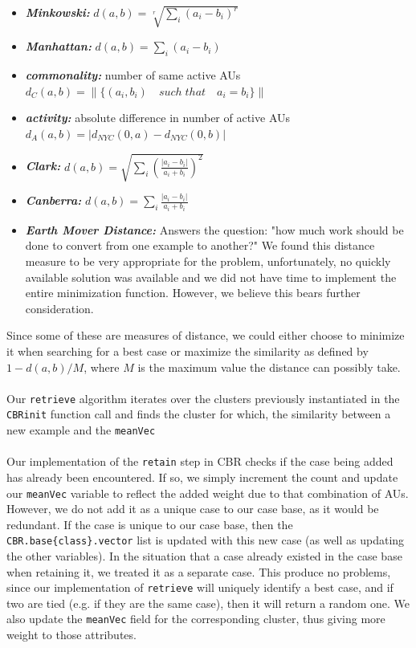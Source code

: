 \documentclass[a4paper,12pt,oneside,final]{report}
\begin{document}
\begin{itemize}
\item {\bf\textit{Minkowski:}} $d(a,b) = \sqrt[r]{\sum_i (a_i - b_i)^r}$
\item {\bf\textit{Manhattan:}} $d(a,b) = \sum_i (a_i - b_i)$
\item {\bf\textit{commonality:}} number of same active AUs $d_C(a, b) = \|\{(a_i, b_i) \quad such\; that \quad a_i = b_i\}\|$
\item {\bf\textit{activity:}} absolute difference in number of active AUs $d_A(a,b) = |d_{NYC}(0, a) - d_{NYC}(0, b)|$
\item {\bf\textit{Clark:}} $d(a, b) = \sqrt{\sum_i \left( \frac{|a_i - b_i|}{a_i + b_i} \right)^2}$
\item {\bf\textit{Canberra:}} $d(a, b) = \sum_i \frac{|a_i - b_i|}{a_i + b_i}$
\item {\bf\textit{Earth Mover Distance:}} Answers the question: "how much work should be done to convert from one example to another?" We found this distance measure to be very appropriate for the problem, unfortunately, no quickly available solution was available and we did not have time to implement the entire minimization function.  However, we believe this bears further consideration.
\end{itemize}
Since some of these are measures of distance, we could either choose to minimize it when searching for a best case or maximize the similarity as defined by $1 - {d(a,b)}/M$, where $M$ is the maximum value the distance can possibly take.

\paragraph{}
Our \verb+retrieve+ algorithm iterates over the clusters previously instantiated in the \verb+CBRinit+ function call and finds the cluster for which, the similarity between a new example and the \verb+meanVec+  
\paragraph{}
Our implementation of the \verb+retain+ step in CBR checks if the case being added has already been encountered.  If so, we simply increment the count and update our \verb+meanVec+ variable to reflect the added weight due to that combination of AUs.  However, we do not add it as a unique case to our case base, as it would be redundant.  If the case is unique to our case base, then the \verb+CBR.base{class}.vector+ list is updated with this new case (as well as updating the other variables).  In the situation that a case already existed in the case base when retaining it, we treated it as a separate case.  This produce no problems, since our implementation of \verb+retrieve+ will uniquely identify a best case, and if two are tied (e.g. if they are the same case), then it will return a random one.  We also update the \verb+meanVec+ field for the corresponding cluster, thus giving more weight to those attributes.
\end{document}
